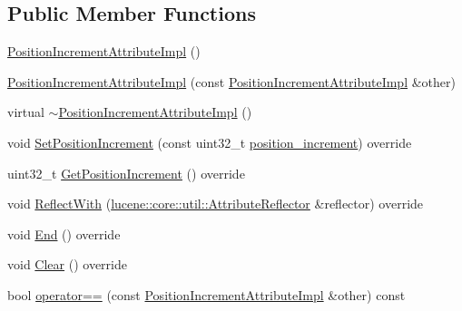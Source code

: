 \subsection*{Public Member Functions}
\begin{DoxyCompactItemize}
\item 
\mbox{\hyperlink{classlucene_1_1core_1_1analysis_1_1tokenattributes_1_1PositionIncrementAttributeImpl_a3a4d29b631b20b0826e06515a76c7a57}{Position\+Increment\+Attribute\+Impl}} ()
\item 
\mbox{\hyperlink{classlucene_1_1core_1_1analysis_1_1tokenattributes_1_1PositionIncrementAttributeImpl_a1982fd1c9538ad47213965386e7d7566}{Position\+Increment\+Attribute\+Impl}} (const \mbox{\hyperlink{classlucene_1_1core_1_1analysis_1_1tokenattributes_1_1PositionIncrementAttributeImpl}{Position\+Increment\+Attribute\+Impl}} \&other)
\item 
virtual \mbox{\hyperlink{classlucene_1_1core_1_1analysis_1_1tokenattributes_1_1PositionIncrementAttributeImpl_a7a7ac9ea7c224e4f2a62e4b199cddde9}{$\sim$\+Position\+Increment\+Attribute\+Impl}} ()
\item 
void \mbox{\hyperlink{classlucene_1_1core_1_1analysis_1_1tokenattributes_1_1PositionIncrementAttributeImpl_a7e1d05c2dab9f80a43df0def33f71c27}{Set\+Position\+Increment}} (const uint32\+\_\+t \mbox{\hyperlink{classlucene_1_1core_1_1analysis_1_1tokenattributes_1_1PositionIncrementAttributeImpl_a3de757124d0bf5a9395e8c943c4ee5cf}{position\+\_\+increment}}) override
\item 
uint32\+\_\+t \mbox{\hyperlink{classlucene_1_1core_1_1analysis_1_1tokenattributes_1_1PositionIncrementAttributeImpl_aed9c6939240be709472fff07ea8f7059}{Get\+Position\+Increment}} () override
\item 
void \mbox{\hyperlink{classlucene_1_1core_1_1analysis_1_1tokenattributes_1_1PositionIncrementAttributeImpl_a2ede3f15304f9760ad60009335123ece}{Reflect\+With}} (\mbox{\hyperlink{namespacelucene_1_1core_1_1util_a7dbb701adaed055f73fb95eec83da10a}{lucene\+::core\+::util\+::\+Attribute\+Reflector}} \&reflector) override
\item 
void \mbox{\hyperlink{classlucene_1_1core_1_1analysis_1_1tokenattributes_1_1PositionIncrementAttributeImpl_adb934ddcbf6f584c50a72c0980b88761}{End}} () override
\item 
void \mbox{\hyperlink{classlucene_1_1core_1_1analysis_1_1tokenattributes_1_1PositionIncrementAttributeImpl_a49cd1a34361a145c3b674f1f3d529641}{Clear}} () override
\item 
bool \mbox{\hyperlink{classlucene_1_1core_1_1analysis_1_1tokenattributes_1_1PositionIncrementAttributeImpl_a5450f58da2745c914e68e7a650e78cc3}{operator==}} (const \mbox{\hyperlink{classlucene_1_1core_1_1analysis_1_1tokenattributes_1_1PositionIncrementAttributeImpl}{Position\+Increment\+Attribute\+Impl}} \&other) const

\end{DoxyCompactItemize}
